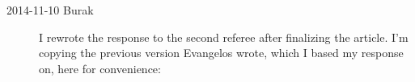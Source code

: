\begin{description}
%
%
%

\item[2014-11-10 Burak] I rewrote the response to the second referee
after finalizing the article. I'm copying the previous version Evangelos
wrote, which I based my response on, here for convenience:
\end{description}

